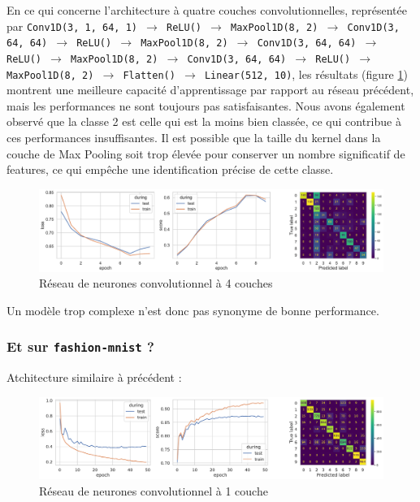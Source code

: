 \documentclass{article}
\begin{document}
En ce qui concerne l'architecture à quatre couches convolutionnelles, représentée par \texttt{Conv1D(3, 1, 64, 1) $\rightarrow$ ReLU() $\rightarrow$ MaxPool1D(8, 2) $\rightarrow$ Conv1D(3, 64, 64) $\rightarrow$ ReLU() $\rightarrow$ MaxPool1D(8, 2) $\rightarrow$ Conv1D(3, 64, 64) $\rightarrow$ ReLU() $\rightarrow$ MaxPool1D(8, 2) $\rightarrow$ Conv1D(3, 64, 64) $\rightarrow$ ReLU() $\rightarrow$ MaxPool1D(8, 2) $\rightarrow$ Flatten() $\rightarrow$ Linear(512, 10)}, les résultats (figure \ref{fig:conv4layers}) montrent une meilleure capacité d'apprentissage par rapport au réseau précédent, mais les performances ne sont toujours pas satisfaisantes. Nous avons également observé que la classe 2 est celle qui est la moins bien classée, ce qui contribue à ces performances insuffisantes. Il est possible que la taille du kernel dans la couche de Max Pooling soit trop élevée pour conserver un nombre significatif de features, ce qui empêche une identification précise de cette classe.

\begin{figure}[htbp]
    \centering
    \includegraphics[width=\textwidth]{conv/conv_4layers.pdf}
    \caption{Réseau de neurones convolutionnel à 4 couches}
    \label{fig:conv4layers}
\end{figure}

Un modèle trop complexe n'est donc pas synonyme de bonne performance.

\subsubsection{Et sur \texttt{fashion-mnist} ?}

Atchitecture similaire à précédent :

\begin{figure}[htbp]
    \centering
    \includegraphics[width=\textwidth]{conv/fashion_conv_1layer_2linear.pdf}
    \caption{Réseau de neurones convolutionnel à 1 couche}
    \label{fig:conv2layers_fashion}
\end{figure}
\end{document}
